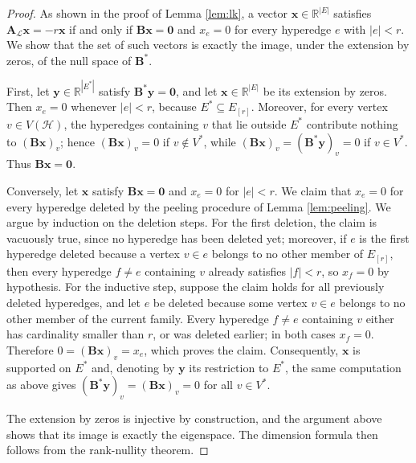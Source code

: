 \documentclass[12pt,reqno]{amsart}
\begin{document}
\begin{proof}
As shown in the proof of Lemma \ref{lem:lk}, a vector $\mathbf{x} \in \mathbb{R}^{|E|}$ satisfies $\mathbf{A}_{\mathcal{L}}\mathbf{x} = -r\mathbf{x}$ if and only if $\mathbf{B}\mathbf{x} = \mathbf{0}$ and $x_e = 0$ for every hyperedge $e$ with $|e| < r$. We show that the set of such vectors is exactly the image, under the extension by zeros, of the null space of $\mathbf{B}^*$.

First, let $\mathbf{y} \in \mathbb{R}^{|E^*|}$ satisfy $\mathbf{B}^*\mathbf{y} = \mathbf{0}$, and let $\mathbf{x} \in \mathbb{R}^{|E|}$ be its extension by zeros. Then $x_e = 0$ whenever $|e| < r$, because $E^* \subseteq E_{[r]}$. Moreover, for every vertex $v \in V(\mathcal{H})$, the hyperedges containing $v$ that lie outside $E^*$ contribute nothing to $(\mathbf{B}\mathbf{x})_v$; hence $(\mathbf{B}\mathbf{x})_v = 0$ if $v \notin V^*$, while $(\mathbf{B}\mathbf{x})_v = (\mathbf{B}^*\mathbf{y})_v = 0$ if $v \in V^*$. Thus $\mathbf{B}\mathbf{x} = \mathbf{0}$.

Conversely, let $\mathbf{x}$ satisfy $\mathbf{B}\mathbf{x} = \mathbf{0}$ and $x_e = 0$ for $|e| < r$. We claim that $x_e = 0$ for every hyperedge deleted by the peeling procedure of Lemma \ref{lem:peeling}. We argue by induction on the deletion steps. For the first deletion, the claim is vacuously true, since no hyperedge has been deleted yet; moreover, if $e$ is the first hyperedge deleted because a vertex $v \in e$ belongs to no other member of $E_{[r]}$, then every hyperedge $f \neq e$ containing $v$ already satisfies $|f| < r$, so $x_f = 0$ by hypothesis. For the inductive step, suppose the claim holds for all previously deleted hyperedges, and let $e$ be deleted because some vertex $v \in e$ belongs to no other member of the current family. Every hyperedge $f \neq e$ containing $v$ either has cardinality smaller than $r$, or was deleted earlier; in both cases $x_f = 0$. Therefore $0 = (\mathbf{B}\mathbf{x})_v = x_e$, which proves the claim. Consequently, $\mathbf{x}$ is supported on $E^*$ and, denoting by $\mathbf{y}$ its restriction to $E^*$, the same computation as above gives $(\mathbf{B}^*\mathbf{y})_v = (\mathbf{B}\mathbf{x})_v = 0$ for all $v \in V^*$.

The extension by zeros is injective by construction, and the argument above shows that its image is exactly the eigenspace. The dimension formula then follows from the rank-nullity theorem.
\end{proof}
\end{document}
